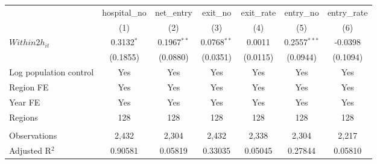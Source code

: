 \begingroup
\centering
\begin{tabular}{lcccccc}
   \toprule
                          & hospital\_no  & net\_entry    & exit\_no      & exit\_rate  & entry\_no      & entry\_rate \\    
                          & (1)           & (2)           & (3)           & (4)         & (5)            & (6)\\  
   \midrule 
   $Within2h_{it}$        & 0.3132$^{*}$  & 0.1967$^{**}$ & 0.0768$^{**}$ & 0.0011      & 0.2557$^{***}$ & -0.0398\\   
                          & (0.1855)      & (0.0880)      & (0.0351)      & (0.0115)    & (0.0944)       & (0.1094)\\   
   Log population control & Yes           & Yes           & Yes           & Yes         & Yes            & Yes\\  
   Region FE              & Yes           & Yes           & Yes           & Yes         & Yes            & Yes\\  
   Year FE                & Yes           & Yes           & Yes           & Yes         & Yes            & Yes\\  
   Regions                & 128           & 128           & 128           & 128         & 128            & 128\\  
    \\
   Observations           & 2,432         & 2,304         & 2,432         & 2,338       & 2,304          & 2,217\\  
   Adjusted R$^2$         & 0.90581       & 0.05819       & 0.33035       & 0.05045     & 0.27844        & 0.05810\\  
   \bottomrule
\end{tabular}
\par\endgroup
